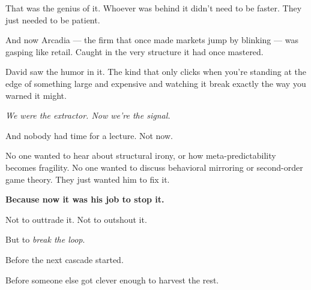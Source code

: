 That was the genius of it.
Whoever was behind it didn’t need to be faster. They just needed to be patient.

And now Arcadia — the firm that once made markets jump by blinking — was gasping like retail. Caught in the very 
structure it had once mastered.

David saw the humor in it. The kind that only clicks when you’re standing at the edge of something large and 
expensive and watching it break exactly the way you warned it might.

\textit{We were the extractor. Now we’re the signal.}

And nobody had time for a lecture. Not now.

No one wanted to hear about structural irony, or how meta-predictability becomes fragility. No one wanted to 
discuss behavioral mirroring or second-order game theory. They just wanted him to fix it.

\textbf{Because now it was his job to stop it.}

Not to outtrade it. Not to outshout it.

But to \textit{break the loop}.

Before the next cascade started.

Before someone else got clever enough to harvest the rest.

\medskip

